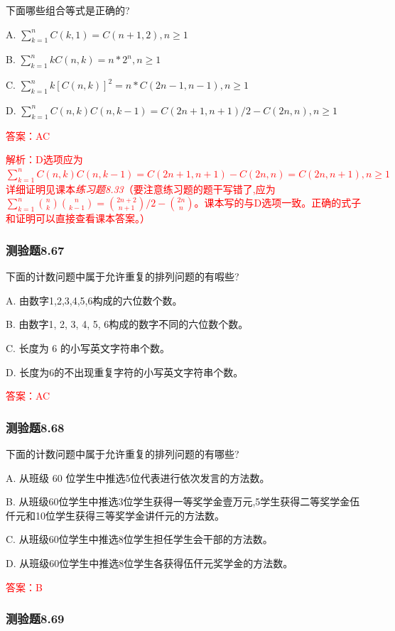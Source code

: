 \documentclass[UTF8, heading=true]{ctexart}
\begin{document}
下面哪些组合等式是正确的?

A. $ \sum_{k=1}^n C(k, 1)=C(n+1,2), n \geq 1$

B. $\sum_{k=1}^n k C(n, k)=n * 2^n, n \geq 1$

C. $ \sum_{k=1}^n k[C(n, k)]^2=n * C(2 n-1, n-1), n \geq 1$

D. $ \sum_{k=1}^n C(n, k) C(n, k-1)=C(2 n+1, n+1) / 2-C(2 n, n), n \geq 1$

\textcolor{red}{答案：AC}

\textcolor{red}{解析：D选项应为$ \sum_{k=1}^n C(n, k) C(n, k-1)=C(2 n+1, n+1)-C(2 n, n) = C(2n,n+1), n \geq 1$
详细证明见课本\textit{练习题8.33}（要注意练习题的题干写错了,应为$\sum_{k=1}^n\binom{n}{k}\binom{n}{k-1}=\binom{2 n+2}{n+1} / 2-\binom{2 n}{n}$。课本写的与D选项一致。正确的式子和证明可以直接查看课本答案。）}

\subsubsection{测验题8.67}

下面的计数问题中属于允许重复的排列问题的有㗇些?

A. 由数字1,2,3,4,5,6构成的六位数个数。

B. 由数字1, 2, 3, 4, 5, 6构成的数字不同的六位数个数。

C. 长度为 6 的小写英文字符串个数。

D. 长度为6的不出现重复字符的小写英文字符串个数。

\textcolor{red}{答案：AC}


\subsubsection{测验题8.68}

下面的计数问题中属于允许重复的排列问题的有哪些?

A. 从班级 60 位学生中推选5位代表进行依次发言的方法数。

B. 从班级60位学生中推选3位学生获得一等奖学金壹万元,5学生获得二等奖学金伍仟元和10位学生获得三等奖学金讲仟元的方法数。

C. 从班级60位学生中推选8位学生担任学生会干部的方法数。

D. 从班级60位学生中推选8位学生各获得伍仠元奖学金的方法数。

\textcolor{red}{答案：B}

\subsubsection{测验题8.69}
\end{document}
